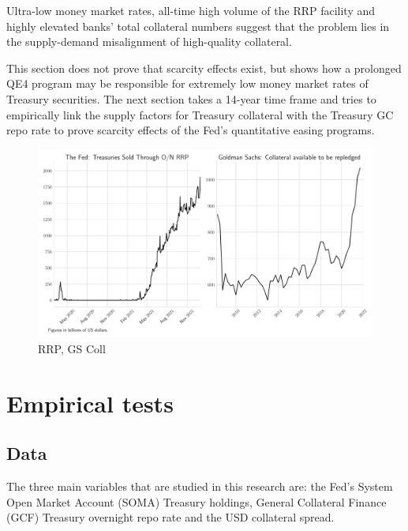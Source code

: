\documentclass[11pt,a4paper,english,oneside]{article}
\begin{document}
Ultra-low money market rates, all-time high volume of the RRP facility and highly elevated banks' total collateral numbers suggest that the problem lies in the supply-demand misalignment of high-quality collateral.

This section does not prove that scarcity effects exist, but shows how a prolonged QE4 program may be responsible for extremely low money market rates of Treasury securities. The next section takes a 14-year time frame and tries to empirically link the supply factors for Treasury collateral with the Treasury GC repo rate to prove scarcity effects of the Fed's quantitative easing programs.

\begin{figure}[htb!]
  \begin{center}
  \caption{RRP, GS Coll}
  \label{fig:rrp+coll}
    \includegraphics[width=0.99\linewidth]{rrp+coll.pdf}
  \end{center}
\end{figure}

\newpage
 
\section{Empirical tests} \label{sec:empirical}

\subsection{Data} \label{sec:data}

The three main variables that are studied in this research are: the Fed's System Open Market Account (SOMA) Treasury holdings, General Collateral Finance (GCF) Treasury overnight repo rate and the USD collateral spread.
\end{document}

